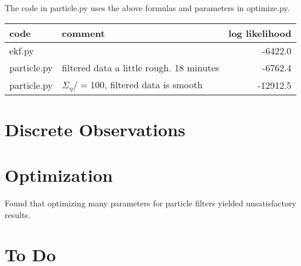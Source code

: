 \documentclass[12pt]{article}
\begin{document}
The code in particle.py uses the above formulas and parameters in
optimize.py.

\begin{tabular}[t]{l|l|r}
  code&comment&log likelihood \\ \hline
  ekf.py & & -6422.0 \\
  particle.py & filtered data a little rough. 18 minutes &
                                                               -6762.4 \\
  particle.py & $\Sigma_\eta /= 100$, filtered data is smooth &
                                                               -12912.5 \\
\end{tabular}

\section{Discrete Observations}
\label{sec:DiscreteObservations}

\section{Optimization}
\label{sec:Optimization}

Found that optimizing many parameters for particle filters yielded
unsatisfactory results.


\section{To Do}
\label{sec:ToDo}
\end{document}
